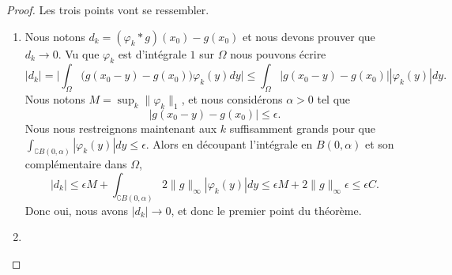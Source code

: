 \begin{proof}
    Les trois points vont se ressembler.
    \begin{enumerate}
        \item
            Nous notons \( d_k=(\varphi_k*g)(x_0)-g(x_0)\) et nous devons prouver que \( d_k\to 0\). Vu que \( \varphi_k\) est d'intégrale \( 1\) sur \( \Omega\) nous pouvons écrire
            \begin{equation}
                |d_k|=\big| \int_{\Omega}\big( g(x_0-y)-g(x_0) \big)\varphi_k(y)dy\big|\leq\int_{\Omega}\big| g(x_0-y)-g(x_0) \big| |\varphi_k(y) |dy.
            \end{equation}
            Nous notons \( M=\sup_k\| \varphi_k \|_1\), et nous considérons \( \alpha>0\) tel que
            \begin{equation}
                \big| g(x_0-y)-g(x_0) \big|\leq \epsilon.
            \end{equation}
            Nous nous restreignons maintenant aux \( k\) suffisamment grands pour que \( \int_{\complement B(0,\alpha)}| \varphi_k(y) |dy\leq \epsilon\). Alors en découpant l'intégrale en \( B(0,\alpha)\) et son complémentaire dans \( \Omega\),
            \begin{equation}
                | d_k |\leq \epsilon M+\int_{\complement B(0,\alpha)} 2\| g \|_{\infty}| \varphi_k(y) |dy  \leq \epsilon M+2\| g \|_{\infty}\epsilon\leq \epsilon C.
            \end{equation}
            Donc oui, nous avons \( | d_k |\to 0\), et donc le premier point du théorème.

        \item


\end{enumerate}
\end{proof}
